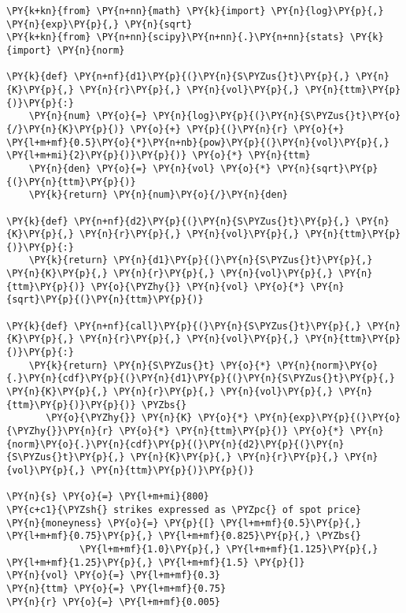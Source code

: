 \begin{Answer}
\begin{tcolorbox}[size=fbox, boxrule=1pt, colback=cellbackground, colframe=cellborder]
\begin{Verbatim}[commandchars=\\\{\}]
\PY{k+kn}{from} \PY{n+nn}{math} \PY{k}{import} \PY{n}{log}\PY{p}{,} \PY{n}{exp}\PY{p}{,} \PY{n}{sqrt}
\PY{k+kn}{from} \PY{n+nn}{scipy}\PY{n+nn}{.}\PY{n+nn}{stats} \PY{k}{import} \PY{n}{norm}

\PY{k}{def} \PY{n+nf}{d1}\PY{p}{(}\PY{n}{S\PYZus{}t}\PY{p}{,} \PY{n}{K}\PY{p}{,} \PY{n}{r}\PY{p}{,} \PY{n}{vol}\PY{p}{,} \PY{n}{ttm}\PY{p}{)}\PY{p}{:}
    \PY{n}{num} \PY{o}{=} \PY{n}{log}\PY{p}{(}\PY{n}{S\PYZus{}t}\PY{o}{/}\PY{n}{K}\PY{p}{)} \PY{o}{+} \PY{p}{(}\PY{n}{r} \PY{o}{+} \PY{l+m+mf}{0.5}\PY{o}{*}\PY{n+nb}{pow}\PY{p}{(}\PY{n}{vol}\PY{p}{,} \PY{l+m+mi}{2}\PY{p}{)}\PY{p}{)} \PY{o}{*} \PY{n}{ttm}
    \PY{n}{den} \PY{o}{=} \PY{n}{vol} \PY{o}{*} \PY{n}{sqrt}\PY{p}{(}\PY{n}{ttm}\PY{p}{)}
    \PY{k}{return} \PY{n}{num}\PY{o}{/}\PY{n}{den}

\PY{k}{def} \PY{n+nf}{d2}\PY{p}{(}\PY{n}{S\PYZus{}t}\PY{p}{,} \PY{n}{K}\PY{p}{,} \PY{n}{r}\PY{p}{,} \PY{n}{vol}\PY{p}{,} \PY{n}{ttm}\PY{p}{)}\PY{p}{:}
    \PY{k}{return} \PY{n}{d1}\PY{p}{(}\PY{n}{S\PYZus{}t}\PY{p}{,} \PY{n}{K}\PY{p}{,} \PY{n}{r}\PY{p}{,} \PY{n}{vol}\PY{p}{,} \PY{n}{ttm}\PY{p}{)} \PY{o}{\PYZhy{}} \PY{n}{vol} \PY{o}{*} \PY{n}{sqrt}\PY{p}{(}\PY{n}{ttm}\PY{p}{)}

\PY{k}{def} \PY{n+nf}{call}\PY{p}{(}\PY{n}{S\PYZus{}t}\PY{p}{,} \PY{n}{K}\PY{p}{,} \PY{n}{r}\PY{p}{,} \PY{n}{vol}\PY{p}{,} \PY{n}{ttm}\PY{p}{)}\PY{p}{:}
    \PY{k}{return} \PY{n}{S\PYZus{}t} \PY{o}{*} \PY{n}{norm}\PY{o}{.}\PY{n}{cdf}\PY{p}{(}\PY{n}{d1}\PY{p}{(}\PY{n}{S\PYZus{}t}\PY{p}{,} \PY{n}{K}\PY{p}{,} \PY{n}{r}\PY{p}{,} \PY{n}{vol}\PY{p}{,} \PY{n}{ttm}\PY{p}{)}\PY{p}{)} \PYZbs{}
       \PY{o}{\PYZhy{}} \PY{n}{K} \PY{o}{*} \PY{n}{exp}\PY{p}{(}\PY{o}{\PYZhy{}}\PY{n}{r} \PY{o}{*} \PY{n}{ttm}\PY{p}{)} \PY{o}{*} \PY{n}{norm}\PY{o}{.}\PY{n}{cdf}\PY{p}{(}\PY{n}{d2}\PY{p}{(}\PY{n}{S\PYZus{}t}\PY{p}{,} \PY{n}{K}\PY{p}{,} \PY{n}{r}\PY{p}{,} \PY{n}{vol}\PY{p}{,} \PY{n}{ttm}\PY{p}{)}\PY{p}{)}

\PY{n}{s} \PY{o}{=} \PY{l+m+mi}{800}
\PY{c+c1}{\PYZsh{} strikes expressed as \PYZpc{} of spot price}
\PY{n}{moneyness} \PY{o}{=} \PY{p}{[} \PY{l+m+mf}{0.5}\PY{p}{,} \PY{l+m+mf}{0.75}\PY{p}{,} \PY{l+m+mf}{0.825}\PY{p}{,} \PYZbs{}
             \PY{l+m+mf}{1.0}\PY{p}{,} \PY{l+m+mf}{1.125}\PY{p}{,} \PY{l+m+mf}{1.25}\PY{p}{,} \PY{l+m+mf}{1.5} \PY{p}{]}
\PY{n}{vol} \PY{o}{=} \PY{l+m+mf}{0.3}
\PY{n}{ttm} \PY{o}{=} \PY{l+m+mf}{0.75}
\PY{n}{r} \PY{o}{=} \PY{l+m+mf}{0.005}


\end{Verbatim}
\end{tcolorbox}
\end{Answer}
